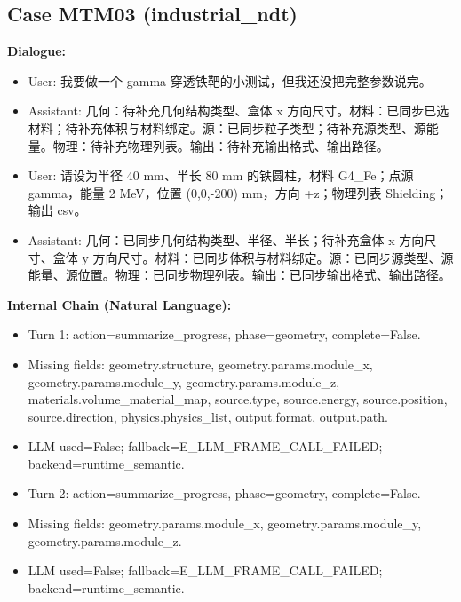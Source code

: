 \documentclass[11pt]{ctexart}
\begin{document}
\subsection{Case MTM03 (industrial\_ndt)}
\textbf{Dialogue:}
\begin{itemize}
\item User: 我要做一个 gamma 穿透铁靶的小测试，但我还没把完整参数说完。
\item Assistant: 几何：待补充几何结构类型、盒体 x 方向尺寸。材料：已同步已选材料；待补充体积与材料绑定。源：已同步粒子类型；待补充源类型、源能量。物理：待补充物理列表。输出：待补充输出格式、输出路径。
\item User: 请设为半径 40 mm、半长 80 mm 的铁圆柱，材料 G4\_Fe；点源 gamma，能量 2 MeV，位置 (0,0,-200) mm，方向 +z；物理列表 Shielding；输出 csv。
\item Assistant: 几何：已同步几何结构类型、半径、半长；待补充盒体 x 方向尺寸、盒体 y 方向尺寸。材料：已同步体积与材料绑定。源：已同步源类型、源能量、源位置。物理：已同步物理列表。输出：已同步输出格式、输出路径。
\end{itemize}
\textbf{Internal Chain (Natural Language):}
\begin{itemize}
\item Turn 1: action=summarize\_progress, phase=geometry, complete=False.
\item Missing fields: geometry.structure, geometry.params.module\_x, geometry.params.module\_y, geometry.params.module\_z, materials.volume\_material\_map, source.type, source.energy, source.position, source.direction, physics.physics\_list, output.format, output.path.
\item LLM used=False; fallback=E\_LLM\_FRAME\_CALL\_FAILED; backend=runtime\_semantic.
\item Turn 2: action=summarize\_progress, phase=geometry, complete=False.
\item Missing fields: geometry.params.module\_x, geometry.params.module\_y, geometry.params.module\_z.
\item LLM used=False; fallback=E\_LLM\_FRAME\_CALL\_FAILED; backend=runtime\_semantic.
\end{itemize}
\end{document}
